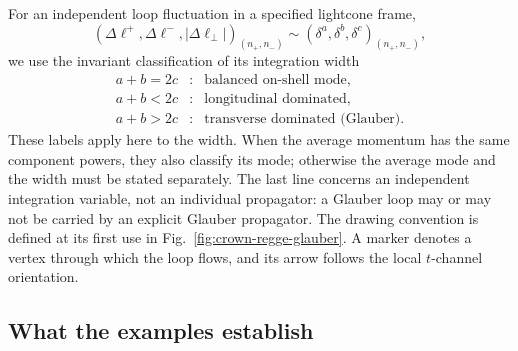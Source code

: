 \documentclass[a4paper,11pt]{article}
\begin{document}
For an independent loop fluctuation in a specified lightcone frame,
\begin{equation}
 (\Delta\ell^+,\Delta\ell^-,|\Delta\ell_\perp|)_{(n_+,n_-)}
 \sim(\delta^a,\delta^b,\delta^c)_{(n_+,n_-)},
 \label{eq:loop-fluctuation-widths}
\end{equation}
we use the invariant classification of its integration width
\begin{equation}
 \begin{array}{lll}
 a+b=2c &:& \text{balanced on-shell mode},\\
 a+b<2c &:& \text{longitudinal dominated},\\
 a+b>2c &:& \text{transverse dominated (Glauber)}.
 \end{array}
 \label{eq:mode-classification}
\end{equation}
These labels apply here to the width.  When the average momentum has the
same component powers, they also classify its mode; otherwise the average mode
and the width must be stated separately.  The last line concerns an
independent integration variable, not an individual propagator: a Glauber loop
may or may not be carried by an explicit Glauber propagator.  The drawing
convention is defined at its first use in
Fig.~\ref{fig:crown-regge-glauber}.  A marker denotes a vertex through which
the loop flows, and its arrow follows the local \(t\)-channel orientation.

\subsection{What the examples establish}
\end{document}
